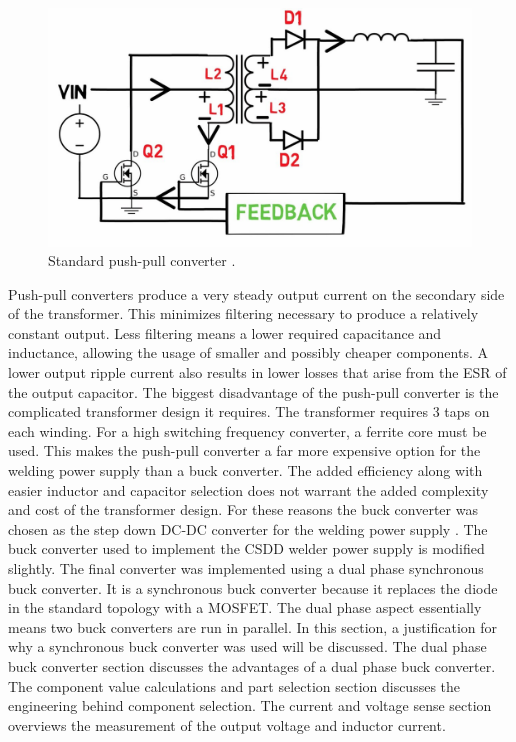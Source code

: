 \documentclass[11pt]{article}
\begin{document}
    \begin{figure}[H]
            \centering
            \includegraphics[width=0.5\linewidth]{maxresdefault.jpg}
            \caption{Standard push-pull converter \cite{maxres_standard_nodate}.}
            \label{push}
            
        \end{figure}
        
    Push-pull converters produce a very steady output current on the secondary side of the transformer. This minimizes filtering necessary to produce a relatively constant output. Less filtering means a lower required capacitance and inductance, allowing the usage of smaller and possibly cheaper components. A lower output ripple current also results in lower losses that arise from the ESR of the output capacitor. The biggest disadvantage of the push-pull converter is the complicated transformer design it requires. The transformer requires 3 taps on each winding. For a high switching frequency converter, a ferrite core must be used. This makes the push-pull converter a far more expensive option for the welding power supply than a buck converter. The added efficiency along with easier inductor and capacitor selection does not warrant the added complexity and cost of the transformer design. For these reasons the buck converter was chosen as the step down DC-DC converter for the welding power supply \cite{wurth_elektronik_gmbh_&_co._switch_2019}.
    \newline
    \newline
   \noindent The buck converter used to implement the CSDD welder power supply is modified slightly. The final converter was implemented using a dual phase synchronous buck converter. It is a synchronous buck converter because it replaces the diode in the standard topology with a MOSFET. The dual phase aspect essentially means two buck converters are run in parallel. 
   \newline
   \newline
   \noindent In this section, a justification for why a synchronous buck converter was used will be discussed. The dual phase buck converter section discusses the advantages of a dual phase buck converter. The component value calculations and part selection section discusses the engineering behind component selection. The current and voltage sense section overviews the measurement of the output voltage and inductor current.
    
\end{document}
